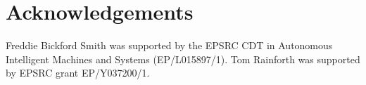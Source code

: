 \section*{Acknowledgements}

Freddie Bickford Smith was supported by the EPSRC CDT in Autonomous Intelligent Machines and Systems (EP/L015897/1).
Tom Rainforth was supported by EPSRC grant EP/Y037200/1.